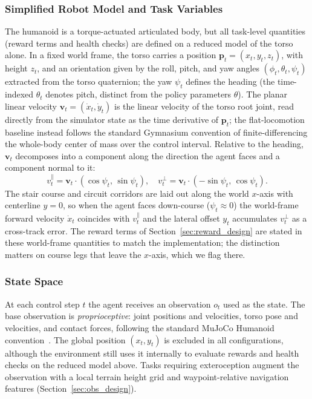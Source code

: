 \documentclass[conference,a4paper]{IEEEtran}
\begin{document}
\subsubsection{Simplified Robot Model and Task Variables}
\label{sec:robot_model}
The humanoid is a torque-actuated articulated body, but all task-level quantities (reward terms and health checks) are defined on a reduced model of the torso alone. In a fixed world frame, the torso carries a position $\mathbf{p}_t = (x_t, y_t, z_t)$, with height $z_t$, and an orientation given by the roll, pitch, and yaw angles $(\phi_t, \theta_t, \psi_t)$ extracted from the torso quaternion; the yaw $\psi_t$ defines the heading (the time-indexed $\theta_t$ denotes pitch, distinct from the policy parameters $\theta$). The planar linear velocity $\mathbf{v}_t = (\dot{x}_t, \dot{y}_t)$ is the linear velocity of the torso root joint, read directly from the simulator state as the time derivative of $\mathbf{p}_t$; the flat-locomotion baseline instead follows the standard Gymnasium convention of finite-differencing the whole-body center of mass over the control interval. Relative to the heading, $\mathbf{v}_t$ decomposes into a component along the direction the agent faces and a component normal to it:
\begin{equation}
\label{eq:heading_decomp}
v_t^{\parallel} = \mathbf{v}_t \cdot (\cos\psi_t,\, \sin\psi_t), \quad
v_t^{\perp} = \mathbf{v}_t \cdot (-\sin\psi_t,\, \cos\psi_t).
\end{equation}
The stair course and circuit corridors are laid out along the world $x$-axis with centerline $y{=}0$, so when the agent faces down-course ($\psi_t \approx 0$) the world-frame forward velocity $\dot{x}_t$ coincides with $v_t^{\parallel}$ and the lateral offset $y_t$ accumulates $v_t^{\perp}$ as a cross-track error. The reward terms of Section~\ref{sec:reward_design} are stated in these world-frame quantities to match the implementation; the distinction matters on course legs that leave the $x$-axis, which we flag there.

\subsubsection{State Space}
At each control step $t$ the agent receives an observation $o_t$ used as the state. The base observation is \emph{proprioceptive}: joint positions and velocities, torso pose and velocities, and contact forces, following the standard MuJoCo Humanoid convention~\cite{towers2024gymnasium}. The global position $(x_t, y_t)$ is excluded in all configurations, although the environment still uses it internally to evaluate rewards and health checks on the reduced model above. Tasks requiring exteroception augment the observation with a local terrain height grid and waypoint-relative navigation features (Section~\ref{sec:obs_design}).
\end{document}
